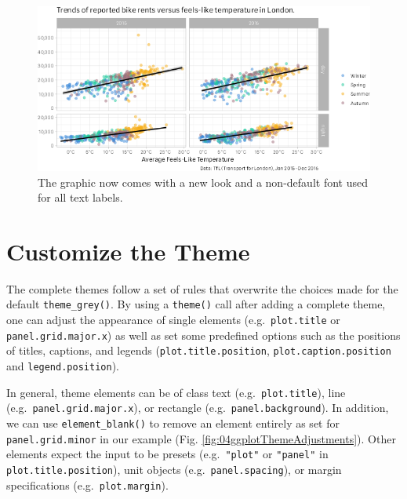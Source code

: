 \documentclass[
]{krantz}
\begin{document}
\begin{figure}
\centering
\includegraphics{bookdown_files/figure-latex/04ggplotThemeComplete-1.png}
\caption{\label{fig:04ggplotThemeComplete}The graphic now comes with a new look and a non-default font used for all text labels.}
\end{figure}

\hypertarget{custom-theming}{%
\section{Customize the Theme}\label{custom-theming}}

The complete themes follow a set of rules that overwrite the choices made for the default \texttt{theme\_grey()}. By using a \texttt{theme()} call after adding a complete theme, one can adjust the appearance of single elements (e.g.~\texttt{plot.title} or \texttt{panel.grid.major.x}) as well as set some predefined options such as the positions of titles, captions, and legends (\texttt{plot.title.position}, \texttt{plot.caption.position} and \texttt{legend.position}).

In general, theme elements can be of class text (e.g.~\texttt{plot.title}), line (e.g.~\texttt{panel.grid.major.x}), or rectangle (e.g.~\texttt{panel.background}). In addition, we can use \texttt{element\_blank()} to remove an element entirely as set for \texttt{panel.grid.minor} in our example (Fig. \ref{fig:04ggplotThemeAdjustments}). Other elements expect the input to be presets (e.g.~\texttt{"plot"} or \texttt{"panel"} in \texttt{plot.title.position}), unit objects (e.g.~\texttt{panel.spacing}), or margin specifications (e.g.~\texttt{plot.margin}).
\end{document}
